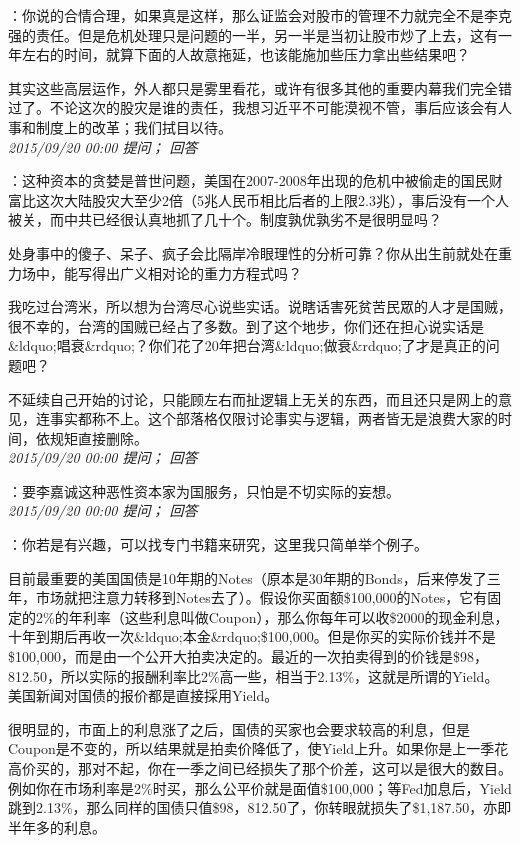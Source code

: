 \documentclass[twocolumn]{ctexart}
\begin{document}
：你说的合情合理，如果真是这样，那么证监会对股市的管理不力就完全不是李克强的责任。但是危机处理只是问题的一半，另一半是当初让股市炒了上去，这有一年左右的时间，就算下面的人故意拖延，也该能施加些压力拿出些结果吧？

其实这些高层运作，外人都只是雾里看花，或许有很多其他的重要内幕我们完全错过了。不论这次的股灾是谁的责任，我想习近平不可能漠视不管，事后应该会有人事和制度上的改革；我们拭目以待。\\

\textit{\hfill\noindent\small 2015/09/20 00:00 提问； 回答}

：这种资本的贪婪是普世问题，美国在2007-2008年出现的危机中被偷走的国民财富比这次大陆股灾大至少2倍（5兆人民币相比后者的上限2.3兆），事后没有一个人被关，而中共已经很认真地抓了几十个。制度孰优孰劣不是很明显吗？

处身事中的傻子、呆子、疯子会比隔岸冷眼理性的分析可靠？你从出生前就处在重力场中，能写得出广义相对论的重力方程式吗？

我吃过台湾米，所以想为台湾尽心说些实话。说瞎话害死贫苦民眾的人才是国贼，很不幸的，台湾的国贼已经占了多数。到了这个地步，你们还在担心说实话是\&ldquo;唱衰\&rdquo;？你们花了20年把台湾\&ldquo;做衰\&rdquo;了才是真正的问题吧？

不延续自己开始的讨论，只能顾左右而扯逻辑上无关的东西，而且还只是网上的意见，连事实都称不上。这个部落格仅限讨论事实与逻辑，两者皆无是浪费大家的时间，依规矩直接删除。\\

\textit{\hfill\noindent\small 2015/09/20 00:00 提问； 回答}

：要李嘉诚这种恶性资本家为国服务，只怕是不切实际的妄想。\\

\textit{\hfill\noindent\small 2015/09/20 00:00 提问； 回答}

：你若是有兴趣，可以找专门书籍来研究，这里我只简单举个例子。

目前最重要的美国国债是10年期的Notes（原本是30年期的Bonds，后来停发了三年，市场就把注意力转移到Notes去了）。假设你买面额\$100,000的Notes，它有固定的2\%的年利率（这些利息叫做Coupon），那么你每年可以收\$2000的现金利息，十年到期后再收一次\&ldquo;本金\&rdquo;\$100,000。但是你买的实际价钱并不是\$100,000，而是由一个公开大拍卖决定的。最近的一次拍卖得到的价钱是\$98，812.50，所以实际的报酬利率比2\%高一些，相当于2.13\%，这就是所谓的Yield。美国新闻对国债的报价都是直接採用Yield。

很明显的，市面上的利息涨了之后，国债的买家也会要求较高的利息，但是Coupon是不变的，所以结果就是拍卖价降低了，使Yield上升。如果你是上一季花高价买的，那对不起，你在一季之间已经损失了那个价差，这可以是很大的数目。例如你在市场利率是2\%时买，那么公平价就是面值\$100,000；等Fed加息后，Yield跳到2.13\%，那么同样的国债只值\$98，812.50了，你转眼就损失了\$1,187.50，亦即半年多的利息。\\
\end{document}
